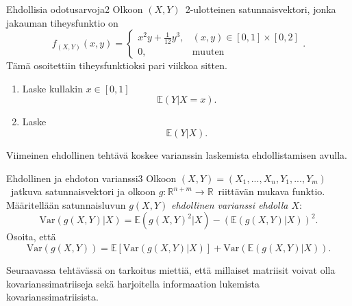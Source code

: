 \documentclass[11pt,a4paper]{amsart}
\newcommand{\R}{\mathbb{R}}
\newcommand{\E}{\mathbb{E}}
\newcommand{\1}{\mathbf{1}}
\begin{document}
\begin{Exercises}{Ehdollisia odotusarvoja}{2}
Olkoon $(X,Y)$ 2-ulotteinen satunnaisvektori, jonka jakauman tiheysfunktio on 
\[
f_{(X,Y)}(x,y)=\begin{cases}
x^2 y+\frac{1}{12}y^3, & (x,y)\in [0,1]\times [0,2]\\
0, & \text{muuten}
\end{cases}.
\]
Tämä osoitettiin tiheysfunktioksi pari viikkoa sitten. 

\begin{enumerate}
\item Laske kullakin $x\in [0,1]$
\[
\E (Y|X=x).
\]

\item Laske 
\[
\E (Y|X).
\]

\end{enumerate}
\end{Exercises}

Viimeinen ehdollinen tehtävä koskee varianssin laskemista ehdollistamisen avulla.

\begin{Exercises}{Ehdollinen ja ehdoton varianssi}{3}
Olkoon $(X,Y)=(X_1,...,X_n,Y_1,...,Y_m)$ jatkuva satunnaisvektori ja olkoon $g:\R^{n+m}\to \R$ riittävän mukava funktio. Määritellään satunnaisluvun $g(X,Y)$ \emph{ehdollinen varianssi ehdolla $X$}:
\[
\mathrm{Var}(g(X,Y)|X)=\E (g(X,Y)^2|X)-(\E(g(X,Y)|X))^2.
\]
Osoita, että 
\[
\mathrm{Var}(g(X,Y))=\E[\mathrm{Var}(g(X,Y)|X)]+\mathrm{Var}(\E(g(X,Y)|X)).
\]

\end{Exercises}

Seuraavassa tehtävässä on tarkoitus miettiä, että millaiset matriisit voivat olla kovarianssimatriiseja sekä harjoitella informaation lukemista kovarianssimatriisista. 
\end{document}
